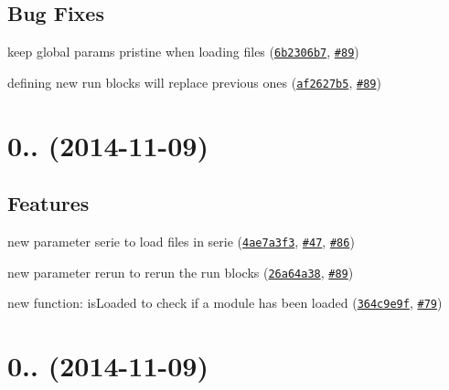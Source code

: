 \subsection*{Bug Fixes}


\begin{DoxyItemize}
\item keep global params pristine when loading files (\href{https://github.com/ocombe/ocLazyLoad/commit/6b2306b71543542c9b592766644c7bba1297bae4}{\tt 6b2306b7}, \href{https://github.com/ocombe/ocLazyLoad/issues/89}{\tt \#89})
\item defining new run blocks will replace previous ones (\href{https://github.com/ocombe/ocLazyLoad/commit/af2627b5e627b2b4d83cdd043eff68b1c1430740}{\tt af2627b5}, \href{https://github.com/ocombe/ocLazyLoad/issues/89}{\tt \#89})
\end{DoxyItemize}

\label{_0.4.0}%
 \section*{0.. (2014-\/11-\/09)}

\subsection*{Features}


\begin{DoxyItemize}
\item new parameter {\ttfamily serie} to load files in serie (\href{https://github.com/ocombe/ocLazyLoad/commit/4ae7a3f3de6ad4de74baa6cc771aee556bce812e}{\tt 4ae7a3f3}, \href{https://github.com/ocombe/ocLazyLoad/issues/47}{\tt \#47}, \href{https://github.com/ocombe/ocLazyLoad/issues/86}{\tt \#86})
\item new parameter {\ttfamily rerun} to rerun the run blocks (\href{https://github.com/ocombe/ocLazyLoad/commit/26a64a38b0c21b6ca28cfa7e512b0b290fdca619}{\tt 26a64a38}, \href{https://github.com/ocombe/ocLazyLoad/issues/89}{\tt \#89})
\item new function\+: {\ttfamily is\+Loaded} to check if a module has been loaded (\href{https://github.com/ocombe/ocLazyLoad/commit/364c9e9ffd8350e5ca46a708bd3846ea6de9421c}{\tt 364c9e9f}, \href{https://github.com/ocombe/ocLazyLoad/issues/79}{\tt \#79})
\end{DoxyItemize}

\label{_0.3.10}%
 \section*{0.. (2014-\/11-\/09)}

